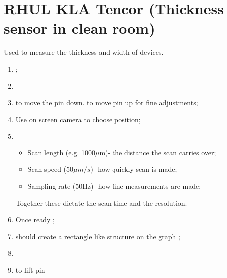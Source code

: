 \section{RHUL KLA Tencor (Thickness sensor in clean room)}
  Used to measure the thickness and width of devices.
  
  \begin{enumerate}
  	\item {};
  	\item {}
  	\item {} to move the pin down.  to move pin up for fine adjustments;
  	\item {} Use on screen camera to choose position;
  	\item {}
  	\begin{itemize}
  		\item Scan length (e.g. 1000$ \mu $m)- the distance the scan carries over;
  		\item Scan speed (50$ \mu m /s$)- how quickly scan is made;
  		\item Sampling rate (50Hz)- how fine measurements are made;
  	\end{itemize}
  	Together these dictate the scan time and the resolution. 

	\item Once ready  ;
	\item {} should create a rectangle like structure on the graph \ra {};
	\item {}
	\item {} to lift pin \ra {}
   \end{enumerate}
 \newpage
 